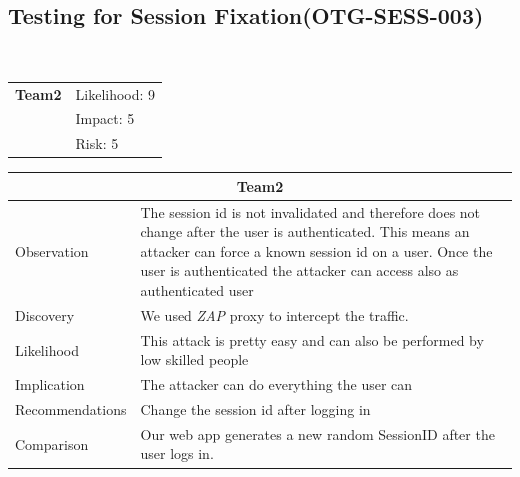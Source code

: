 \documentclass[headsepline,footsepline,footinclude=false,oneside,fontsize=11pt,paper=a4,listof=totoc,bibliography=totoc]{scrbook} %
\begin{document}
\pagebreak
\subsection{Testing for Session Fixation(OTG-SESS-003)}\

\begin{tabular}{cR{12cm}}
	\textbf{Team2} & Likelihood: 9\\& Impact: 5\\& Risk: 5
\end{tabular}

\begin{tabular}{ l|p{11cm}  }
	\hline
	\multicolumn{2}{c}{\textbf{Team2}} \\
	\hline
	Observation   & The session id is not invalidated and therefore does not change after the user is authenticated. This means
	an attacker can force a known session id on a user. Once the user is authenticated the attacker can access also as authenticated
	user \\
	Discovery  & We used \textit{ZAP} proxy to intercept the traffic.\\
	Likelihood & This attack is pretty easy and can also be performed by low skilled people\\
	Implication    & The attacker can do everything the user can \\
	Recommendations& Change the session id after logging in \\
	Comparison & Our web app generates a new random SessionID after the user logs in.\\
	\hline
\end{tabular}
\\
\vspace{0.5cm}
\\
\end{document}
